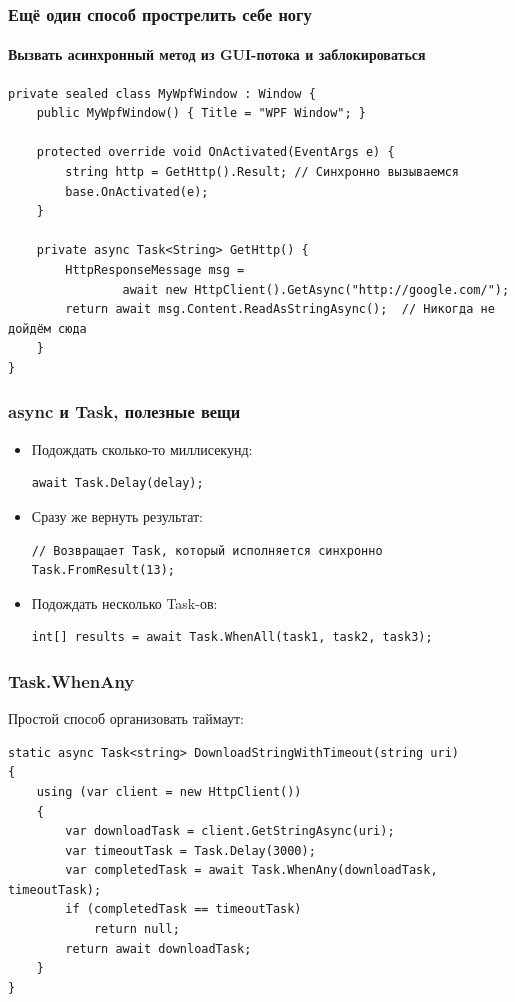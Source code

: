 \documentclass[xetex,mathserif,serif]{beamer}
\begin{document}
    \begin{frame}[fragile]
        \frametitle{Ещё один способ прострелить себе ногу}
        \framesubtitle{Вызвать асинхронный метод из GUI-потока и заблокироваться}
        \begin{footnotesize}
            \begin{verbatim}
private sealed class MyWpfWindow : Window {
    public MyWpfWindow() { Title = "WPF Window"; }

    protected override void OnActivated(EventArgs e) {
        string http = GetHttp().Result; // Синхронно вызываемся
        base.OnActivated(e);
    }

    private async Task<String> GetHttp() {
        HttpResponseMessage msg = 
                await new HttpClient().GetAsync("http://google.com/");
        return await msg.Content.ReadAsStringAsync();  // Никогда не дойдём сюда
    }
}
            \end{verbatim}
        \end{footnotesize}
    \end{frame}

    \begin{frame}[fragile]
        \frametitle{async и Task, полезные вещи}
        \begin{itemize}
            \item Подождать сколько-то миллисекунд:
            \begin{verbatim}
await Task.Delay(delay);
            \end{verbatim}

            \item Сразу же вернуть результат:
            \begin{verbatim}
// Возвращает Task, который исполняется синхронно
Task.FromResult(13);
            \end{verbatim}

            \item Подождать несколько Task-ов:
            \begin{verbatim}
int[] results = await Task.WhenAll(task1, task2, task3);
            \end{verbatim}
        \end{itemize}
    \end{frame}

    \begin{frame}[fragile]
        \frametitle{Task.WhenAny}
        Простой способ организовать таймаут:
        \begin{small}
            \begin{verbatim}
static async Task<string> DownloadStringWithTimeout(string uri)
{
    using (var client = new HttpClient())
    {
        var downloadTask = client.GetStringAsync(uri);
        var timeoutTask = Task.Delay(3000);
        var completedTask = await Task.WhenAny(downloadTask, timeoutTask);
        if (completedTask == timeoutTask)
            return null;
        return await downloadTask;
    }
}
            \end{verbatim}
        \end{small}
    \end{frame}
\end{document}
